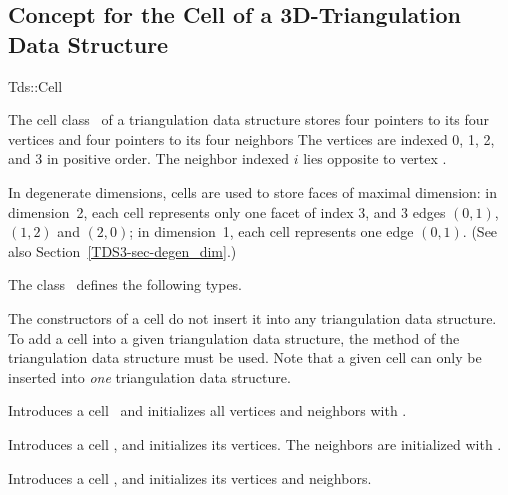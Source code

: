 	\subsection{Concept for the Cell of a 3D-Triangulation Data Structure} 
	\label{TDS3-sec-concept-Tds_Cell}

	\begin{ccClass}{Tds::Cell}


The cell class \ccClassName\ of a triangulation data structure stores
four pointers to its four vertices and four pointers to its four
neighbors The vertices are indexed 0, 1, 2, and 3 in positive order.
The neighbor indexed $i$ lies opposite to vertex .

In degenerate dimensions, cells are used to store faces of maximal
dimension: in dimension~2, each cell represents only one
facet of index 3, and 3 edges $(0,1)$, $(1,2)$ and $(2,0)$; in
dimension~1, each cell represents one edge $(0,1)$. (See also
Section~\ref{TDS3-sec-degen_dim}.) 

\ccTypes
{}
\ccThreeToTwo
The class \ccClassName\ defines the following types.

\ccGlue
{}

\ccCreation
{}

The constructors of a cell do not insert it into any triangulation
data structure. To add a cell into a given triangulation
data structure, the  method of the triangulation
data structure must be used. Note that a given cell can only be
inserted into \textit{one} triangulation data structure.

{Introduces a cell \ccVar\ and initializes all vertices and neighbors 
 with .}


{Introduces a cell \ccVar, and initializes its vertices. The neighbors
are initialized with .} 

{Introduces a cell \ccVar, and initializes its vertices and neighbors.}


\end{ccClass}

